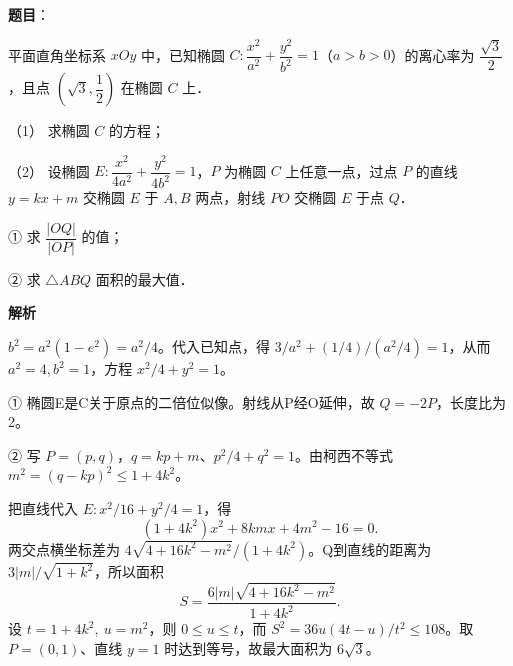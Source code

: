 \begin{answer}

\textbf{题目}：

平面直角坐标系 \(xOy\) 中，已知椭圆 \(C:\dfrac{x^2}{a^2}+\dfrac{y^2}{b^2}=1\)（\(a>b>0\)）的离心率为 \(\dfrac{\sqrt3}{2}\)，且点 \(\left(\sqrt3,\dfrac12\right)\) 在椭圆 \(C\) 上．

（1） 求椭圆 \(C\) 的方程；

（2） 设椭圆 \(E:\dfrac{x^2}{4a^2}+\dfrac{y^2}{4b^2}=1\)，\(P\) 为椭圆 \(C\) 上任意一点，过点 \(P\) 的直线 \(y=kx+m\) 交椭圆 \(E\) 于 \(A,B\) 两点，射线 \(PO\) 交椭圆 \(E\) 于点 \(Q\)．

① 求 \(\dfrac{|OQ|}{|OP|}\) 的值；

② 求 \(\triangle ABQ\) 面积的最大值．

\textbf{解析}


\(b^2=a^2(1-e^2)=a^2/4\)。代入已知点，得 \(3/a^2+(1/4)/(a^2/4)=1\)，从而 \(a^2=4,b^2=1\)，方程 \(x^2/4+y^2=1\)。


① 椭圆E是C关于原点的二倍位似像。射线从P经O延伸，故 \(Q=-2P\)，长度比为2。

② 写 \(P=(p,q)\)，\(q=kp+m\)、\(p^2/4+q^2=1\)。由柯西不等式 \(m^2=(q-kp)^2\leqslant1+4k^2\)。

把直线代入 \(E:x^2/16+y^2/4=1\)，得
\nopagebreak[4]
\[
(1+4k^2)x^2+8kmx+4m^2-16=0.
\]
两交点横坐标差为 \(4\sqrt{4+16k^2-m^2}/(1+4k^2)\)。Q到直线的距离为 \(3|m|/\sqrt{1+k^2}\)，所以面积
\nopagebreak[4]
\[
S=\frac{6|m|\sqrt{4+16k^2-m^2}}{1+4k^2}.
\]
设 \(t=1+4k^2,\ u=m^2\)，则 \(0\leqslant u\leqslant t\)，而 \(S^2=36u(4t-u)/t^2\leqslant108\)。取 \(P=(0,1)\)、直线 \(y=1\) 时达到等号，故最大面积为 \(6\sqrt3\)。



\end{answer}